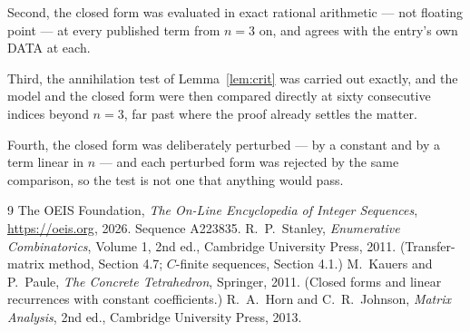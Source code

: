 \documentclass[11pt,a4paper]{article}
\theoremstyle{plain}
\theoremstyle{definition}
\begin{document}
Second, the closed form was evaluated in exact rational arithmetic --- not floating point ---
at every published term from $n=3$ on, and agrees with the entry's own DATA at each.

Third, the annihilation test of Lemma~\ref{lem:crit} was carried out exactly, and the model
and the closed form were then compared directly at sixty consecutive indices beyond
$n=3$, far past where the proof already settles the matter.

Fourth, the closed form was deliberately perturbed --- by a constant and by a term linear in
$n$ --- and each perturbed form was rejected by the same comparison, so the test is not one
that anything would pass.

\begin{thebibliography}{9}
 The OEIS Foundation, \emph{The On-Line Encyclopedia of Integer
Sequences}, \url{https://oeis.org}, 2026. Sequence A223835.
 R.~P.~Stanley, \emph{Enumerative Combinatorics}, Volume 1, 2nd ed.,
Cambridge University Press, 2011. (Transfer-matrix method, Section 4.7; $C$-finite sequences,
Section 4.1.)
 M.~Kauers and P.~Paule, \emph{The Concrete Tetrahedron}, Springer, 2011.
(Closed forms and linear recurrences with constant coefficients.)
 R.~A.~Horn and C.~R.~Johnson, \emph{Matrix Analysis}, 2nd ed., Cambridge
University Press, 2013.
\end{thebibliography}
\end{document}
